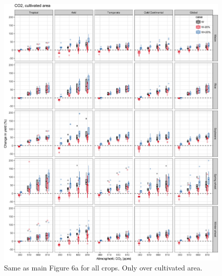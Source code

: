 \documentclass[10pt]{article}
\begin{document}
\begin{figure}[h!]
    \centering
    \includegraphics[width=\textwidth]{s_sim_CG_C_area.png}
    \caption{Same as main Figure 6a for all crops. Only over cultivated area.}
    \label{fig:carbon}
\end{figure}
\end{document}
